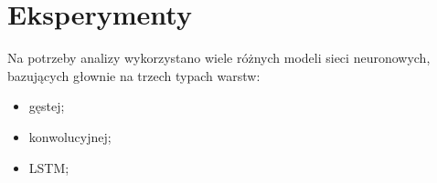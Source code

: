 \newpage %
\section{Eksperymenty}







Na potrzeby analizy wykorzystano wiele różnych modeli sieci neuronowych, bazujących głownie na trzech typach warstw:

\begin{itemize}
    \item gęstej;
    \item konwolucyjnej;
    \item LSTM;
\end{itemize}

